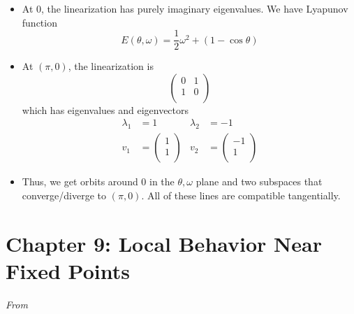 \documentclass[../notes.tex]{subfiles}
\begin{document}
\begin{itemize}
\begin{itemize}
        \item At 0, the linearization has purely imaginary eigenvalues. We have Lyapunov function
        \begin{equation*}
            E(\theta,\omega) = \frac{1}{2}\omega^2+(1-\cos\theta)
        \end{equation*}
        \item At $(\pi,0)$, the linearization is
        \begin{equation*}
            \begin{pmatrix}
                0 & 1\\
                1 & 0\\
            \end{pmatrix}
        \end{equation*}
        which has eigenvalues and eigenvectors
        \begin{align*}
            \lambda_1 &= 1&
                \lambda_2 &= -1\\
            v_1 &=
            \begin{pmatrix}
                1\\
                1\\
            \end{pmatrix}&
                v_2 &=
                \begin{pmatrix}
                    -1\\
                    1\\
                \end{pmatrix}
        \end{align*}
        \item Thus, we get orbits around 0 in the $\theta,\omega$ plane and two subspaces that converge/diverge to $(\pi,0)$. All of these lines are compatible tangentially.
    \end{itemize}
\end{itemize}



\section{Chapter 9: Local Behavior Near Fixed Points}
\emph{From \textcite{bib:Teschl}}
\end{document}
